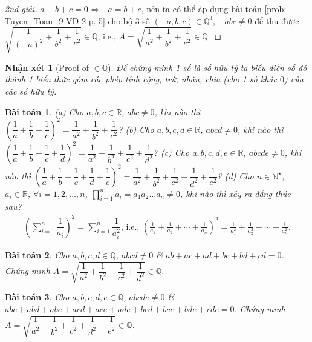 \documentclass{article}
\newtheorem{baitoan}{Bài toán}
\newtheorem{nhanxet}{Nhận xét}
\begin{document}
\begin{proof}[2nd giải]
	$a + b + c = 0\Leftrightarrow -a = b + c$, nên ta có thể áp dụng bài toán \ref{prob: Tuyen_Toan_9 VD 2 p. 5} cho bộ 3 số $(-a,b,c)\in\mathbb{Q}^3$, $-abc\ne0$ để thu được $\sqrt{\dfrac{1}{(-a)^2} + \dfrac{1}{b^2} + \dfrac{1}{c^2}}\in\mathbb{Q}$, i.e., $A = \sqrt{\dfrac{1}{a^2} + \dfrac{1}{b^2} + \dfrac{1}{c^2}}\in\mathbb{Q}$.
\end{proof}

\begin{nhanxet}[Proof of $\in\mathbb{Q}$]
	Để chứng minh 1 số là số hữu tỷ ta biểu diễn số đó thành 1 biểu thức gồm các phép tính cộng, trừ, nhân, chia (cho 1 số khác $0$) của các số hữu tỷ.
\end{nhanxet}

\begin{baitoan}
	(a) Cho $a,b,c\in\mathbb{R}$, $abc\ne0$, khi nào thì $\left(\dfrac{1}{a} + \dfrac{1}{b} + \dfrac{1}{c}\right)^2 = \dfrac{1}{a^2} + \dfrac{1}{b^2} + \dfrac{1}{c^2}$? (b) Cho $a,b,c,d\in\mathbb{R}$, $abcd\ne0$, khi nào thì $\left(\dfrac{1}{a} + \dfrac{1}{b} + \dfrac{1}{c} + \dfrac{1}{d}\right)^2 = \dfrac{1}{a^2} + \dfrac{1}{b^2} + \dfrac{1}{c^2} + \dfrac{1}{d^2}$? (c) Cho $a,b,c,d,e\in\mathbb{R}$, $abcde\ne0$, khi nào thì $\left(\dfrac{1}{a} + \dfrac{1}{b} + \dfrac{1}{c} + \dfrac{1}{d} + \dfrac{1}{e}\right)^2 = \dfrac{1}{a^2} + \dfrac{1}{b^2} + \dfrac{1}{c^2} + \dfrac{1}{d^2} + \dfrac{1}{e^2}$? (d) Cho $n\in\mathbb{N}^\star$, $a_i\in\mathbb{R}$, $\forall i = 1,2,\ldots,n$, $\prod_{i=1}^n a_i = a_1a_2\ldots a_n\ne0$, khi nào thì xảy ra đẳng thức sau?
	\begin{align*}
		\left(\sum_{i=1}^n \dfrac{1}{a_i}\right)^2 = \sum_{i=1}^n \dfrac{1}{a_i^2}\mbox{, i.e., } \left(\frac{1}{a_1} + \frac{1}{a_2} + \cdots + \frac{1}{a_n}\right)^2 = \frac{1}{a_1^2} + \frac{1}{a_2^2} + \cdots + \frac{1}{a_n^2}.
	\end{align*}
\end{baitoan}

\begin{baitoan}
	Cho $a,b,c,d\in\mathbb{Q}$, $abcd\ne0$ \& $ab + ac + ad + bc + bd + cd = 0$. Chứng minh $A = \sqrt{\dfrac{1}{a^2} + \dfrac{1}{b^2} + \dfrac{1}{c^2} + \dfrac{1}{d^2}}\in\mathbb{Q}$.
\end{baitoan}

\begin{baitoan}
	Cho $a,b,c,d,e\in\mathbb{Q}$, $abcde\ne0$ \& $abc + abd + abe + acd + ace + ade + bcd + bce + bde + cde = 0$. Chứng minh $A = \sqrt{\dfrac{1}{a^2} + \dfrac{1}{b^2} + \dfrac{1}{c^2} + \dfrac{1}{d^2} + \dfrac{1}{e^2}}\in\mathbb{Q}$.
\end{baitoan}
\end{document}
